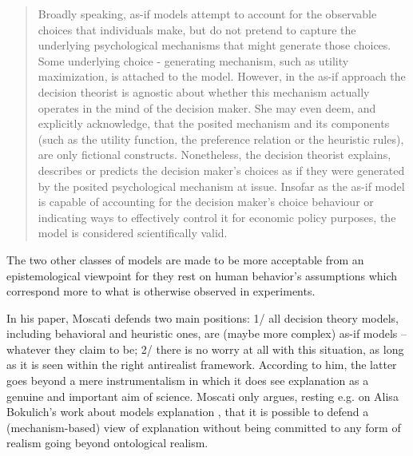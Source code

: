 \documentclass[a4paper,11pt]{article}
\begin{document}
\begin{quote}
Broadly speaking, as-if models attempt to account for the observable choices that
individuals make, but do not pretend to capture the underlying psychological
mechanisms that might generate those choices. Some underlying choice -
generating mechanism, such as utility maximization, is attached to the model.
However, in the as-if approach the decision theorist is agnostic about whether
this mechanism actually operates in the mind of the decision maker. She may
even deem, and explicitly acknowledge, that the posited mechanism and its
components (such as the utility function, the preference relation or the heuristic
rules), are only fictional constructs. Nonetheless, the decision theorist explains,
describes or predicts the decision maker’s choices as if they were generated by
the posited psychological mechanism at issue. Insofar as the as-if model is
capable of accounting for the decision maker’s choice behaviour or indicating ways to effectively control it for economic policy purposes, the model is considered
scientifically valid.
\end{quote}


The two other classes of models are made to be more acceptable from an epistemological viewpoint for they rest on human behavior's assumptions which correspond more to what is otherwise observed in experiments.

In his paper, Moscati defends two main positions: 1/ all decision theory models, including behavioral and heuristic ones, are (maybe more complex) as-if models -- whatever they claim to be; 2/ there is no worry at all with this situation, as long as it is seen within the right antirealist framework. According to him, the latter goes beyond a mere instrumentalism in which it does see explanation as a genuine and important aim of science. Moscati only argues, resting e.g. on Alisa Bokulich's work about models explanation \citep{Bokulich2009}, that it is possible to defend a (mechanism-based) view of explanation without being committed to any form of realism going beyond ontological realism. 


 

\end{document}
